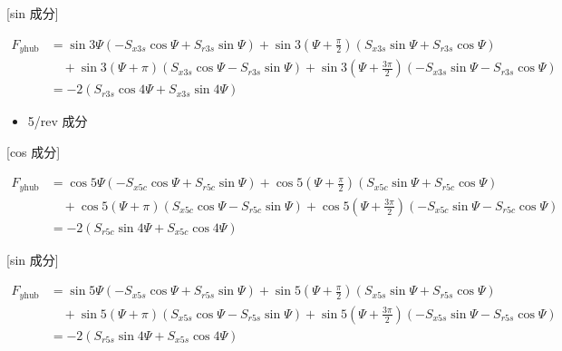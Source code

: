     [sin 成分]

    \begin{align}
    F_{y\mathrm{hub}}
    &= \sin 3\Psi
    \left(
    - S_{x3s}\cos\Psi + S_{r3s}\sin\Psi
    \right)
    + \sin 3\left(\Psi + \frac{\pi}{2}\right)
    \left(
    S_{x3s}\sin\Psi + S_{r3s}\cos\Psi
    \right) \nonumber \\
    &\quad
    + \sin 3(\Psi + \pi)
    \left(
    S_{x3s}\cos\Psi - S_{r3s}\sin\Psi
    \right)
    + \sin 3\left(\Psi + \frac{3\pi}{2}\right)
    \left(
    - S_{x3s}\sin\Psi - S_{r3s}\cos\Psi
    \right) \nonumber \\
    &= -2\left(
    S_{r3s}\cos 4\Psi + S_{x3s}\sin 4\Psi
    \right)
    \end{align}

    \begin{itemize}
    \item 5/rev 成分
    \end{itemize}

    [cos 成分]

    \begin{align}
    F_{y\mathrm{hub}}
    &= \cos 5\Psi
    \left(
    - S_{x5c}\cos\Psi + S_{r5c}\sin\Psi
    \right)
    + \cos 5\left(\Psi + \frac{\pi}{2}\right)
    \left(
    S_{x5c}\sin\Psi + S_{r5c}\cos\Psi
    \right) \nonumber \\
    &\quad
    + \cos 5(\Psi + \pi)
    \left(
    S_{x5c}\cos\Psi - S_{r5c}\sin\Psi
    \right)
    + \cos 5\left(\Psi + \frac{3\pi}{2}\right)
    \left(
    - S_{x5c}\sin\Psi - S_{r5c}\cos\Psi
    \right) \nonumber \\
    &= -2\left(
    S_{r5c}\sin 4\Psi + S_{x5c}\cos 4\Psi
    \right)
    \end{align}

    [sin 成分]

    \begin{align}
    F_{y\mathrm{hub}}
    &= \sin 5\Psi
    \left(
    - S_{x5s}\cos\Psi + S_{r5s}\sin\Psi
    \right)
    + \sin 5\left(\Psi + \frac{\pi}{2}\right)
    \left(
    S_{x5s}\sin\Psi + S_{r5s}\cos\Psi
    \right) \nonumber \\
    &\quad
    + \sin 5(\Psi + \pi)
    \left(
    S_{x5s}\cos\Psi - S_{r5s}\sin\Psi
    \right)
    + \sin 5\left(\Psi + \frac{3\pi}{2}\right)
    \left(
    - S_{x5s}\sin\Psi - S_{r5s}\cos\Psi
    \right) \nonumber \\
    &= -2\left(
    S_{r5s}\sin 4\Psi + S_{x5s}\cos 4\Psi
    \right)
    \end{align}

